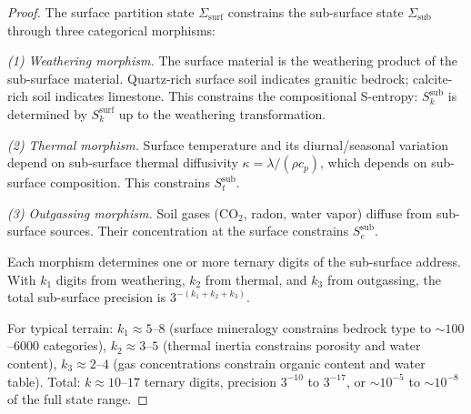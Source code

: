 \documentclass[10pt,twocolumn]{article}
\theoremstyle{definition}
\theoremstyle{remark}
\newcommand{\Sk}{S_k}
\newcommand{\St}{S_t}
\newcommand{\Se}{S_e}
\begin{document}
\begin{proof}
The surface partition state $\Sigma_{\mathrm{surf}}$
constrains the sub-surface state
$\Sigma_{\mathrm{sub}}$ through three categorical morphisms:

\emph{(1) Weathering morphism.}  The surface material is the
weathering product of the sub-surface material.  Quartz-rich
surface soil indicates granitic bedrock; calcite-rich soil
indicates limestone.  This constrains the compositional
S-entropy: $\Sk^{\mathrm{sub}}$ is determined by
$\Sk^{\mathrm{surf}}$ up to the weathering transformation.

\emph{(2) Thermal morphism.}  Surface temperature and its
diurnal/seasonal variation depend on sub-surface thermal
diffusivity $\kappa = \lambda/(\rho c_p)$, which depends on
sub-surface composition.  This constrains $\St^{\mathrm{sub}}$.

\emph{(3) Outgassing morphism.}  Soil gases (CO$_2$, radon,
water vapor) diffuse from sub-surface sources.  Their
concentration at the surface constrains $\Se^{\mathrm{sub}}$.

Each morphism determines one or more ternary digits of the
sub-surface address.  With $k_1$ digits from weathering,
$k_2$ from thermal, and $k_3$ from outgassing, the total
sub-surface precision is $3^{-(k_1+k_2+k_3)}$.

For typical terrain: $k_1\approx 5$--$8$ (surface mineralogy
constrains bedrock type to $\sim 100$--$6000$ categories),
$k_2\approx 3$--$5$ (thermal inertia constrains porosity and
water content), $k_3\approx 2$--$4$ (gas concentrations
constrain organic content and water table).  Total:
$k\approx 10$--$17$ ternary digits, precision $3^{-10}$ to
$3^{-17}$, or $\sim 10^{-5}$ to $\sim 10^{-8}$ of the full
state range.
\end{proof}
\end{document}
